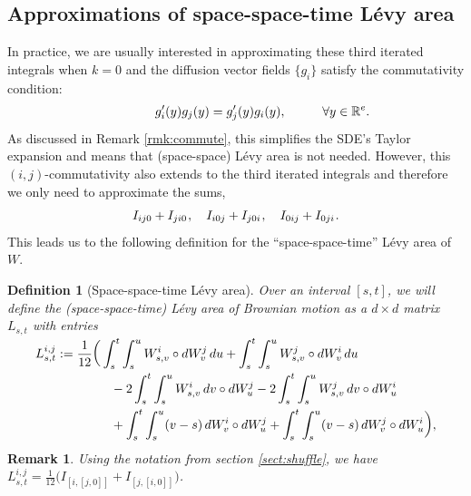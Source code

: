 \documentclass[sn-mathphys-num]{sn-jnl}%
\newtheorem{remark}{Remark}%
\newtheorem{definition}{Definition}%
\newcommand{\R}{\mathbb{R}}
\newcommand{\m}{\hspace{0.25mm}}
\begin{document}
\subsection{Approximations of space-space-time L\'{e}vy area}

In practice, we are usually interested in approximating these third iterated integrals when $k = 0$ and the diffusion vector fields $\{g_i\}$ satisfy the commutativity condition:
\begin{align}\label{eq:commute_condition}
\hspace*{15mm} g_i^\prime(y) g_j(y) = g_j^\prime(y) g_i(y),\hspace{10mm}\forall y\in\R^e.
\end{align}
As discussed in Remark \ref{rmk:commute}, this simplifies the SDE's Taylor expansion and means that (space-space) L\'{e}vy area is not needed. However, this $(i,j)$-commutativity also extends to the third iterated integrals and therefore we only need to approximate the sums,
\begin{align*}
I_{ij0} + I_{ji0}\m,\quad I_{i0j} + I_{j0i}\m,\quad I_{0ij} + I_{0ji}\m.
\end{align*}
This leads us to the following definition for the ``space-space-time'' L\'{e}vy area of $W$.\medbreak
\begin{definition}[Space-space-time L\'{e}vy area]
Over an interval $[s,t]$, we will define the (space-space-time) L\'{e}vy area of Brownian motion as a $d\times d$ matrix $L_{s,t}$ with entries
\begin{align}
&\nonumber\\[-20pt]
L_{s,t}^{i,j} & := \frac{1}{12}\bigg(\int_s^t\int_s^u W_{s,v}^i \circ dW_v^j\, du + \int_s^t\int_s^u W_{s,v}^j \circ dW_v^i\, du\label{eq:sst_levy}\\[-1pt]
&\hspace{15mm} - 2\int_s^t\int_s^u W_{s,v}^i\, dv \circ dW_u^j - 2\int_s^t\int_s^u W_{s,v}^j\, dv \circ dW_u^i\nonumber\\
&\hspace{15mm} + \int_s^t\int_s^u (v-s)\, dW_v^i \circ dW_u^j + \int_s^t\int_s^u (v-s)\, dW_v^j \circ dW_u^i\bigg),\nonumber\\[-20pt] \nonumber
\end{align}
\end{definition}
\begin{remark}
Using the notation from section \ref{sect:shuffle}, we  have $L_{s,t}^{i,j} = \frac{1}{12}\big(I_{[i,[j,0]]} + I_{[j,[i,0]]}\big)$.
\end{remark}\medbreak
\end{document}
